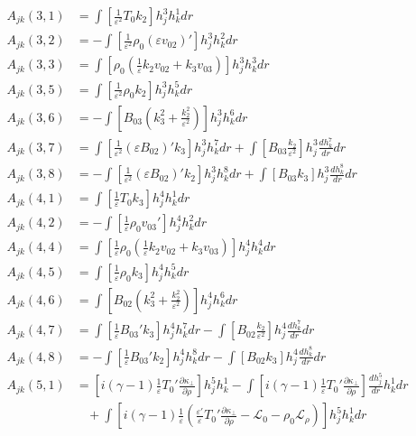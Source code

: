 \documentclass[11pt, fleqn]{article}
\newcommand{\HL}{\mathscr{L}}
\newcommand{\eps}{\varepsilon}
\begin{document}
\begin{align*}
	A_{jk}(3, 1) &=  \int \left[\frac{1}{\eps^2}T_0k_2\right]h_j^3 h_k^1 dr																				\\
	A_{jk}(3, 2) &= -\int \left[\frac{1}{\eps^2}\rho_0(\eps v_{02})'\right]h_j^3 h_k^2 dr																\\
	A_{jk}(3, 3) &=  \int \left[\rho_0\left(\frac{1}{\eps}k_2v_{02} + k_3v_{03}\right)\right] h_j^3 h_k^3 dr											\\
	A_{jk}(3, 5) &=  \int \left[\frac{1}{\eps^2}\rho_0k_2\right] h_j^3 h_k^5 dr																			\\
	A_{jk}(3, 6) &= -\int \left[B_{03}\left(k_3^2 + \frac{k_2^2}{\eps^2}\right)\right]h_j^3 h_k^6 dr													\\
	A_{jk}(3, 7) &=  \int \left[\frac{1}{\eps^2}(\eps B_{02})'k_3\right] h_j^3 h_k^7 dr  +  \int \left[ B_{03}\frac{k_2}{\eps^2}\right] h_j^3 \frac{dh_k^7}{dr} dr	\\
	A_{jk}(3, 8) &= -\int \left[\frac{1}{\eps^2}(\eps B_{02})'k_2\right] h_j^3 h_k^8 dr  +  \int \left[ B_{03}k_3\right]h_j^3 \frac{dh_k^8}{dr} dr		\\
	A_{jk}(4, 1) &=  \int \left[\frac{1}{\eps}T_0k_3\right] h_j^4 h_k^1 dr																				\\
	A_{jk}(4, 2) &= -\int \left[\frac{1}{\eps}\rho_0v_{03}'\right] h_j^4 h_k^2 dr																		\\
	A_{jk}(4, 4) &=  \int \left[\frac{1}{\eps}\rho_0\left(\frac{1}{\eps}k_2v_{02} + k_3v_{03}\right)\right] h_j^4 h_k^4 dr								\\
	A_{jk}(4, 5) &=  \int \left[\frac{1}{\eps}\rho_0k_3\right] h_j^4 h_k^5 dr																			\\
	A_{jk}(4, 6) &=  \int \left[B_{02}\left(k_3^2 + \frac{k_2^2}{\eps^2}\right)\right] h_j^4 h_k^6 dr													\\
	A_{jk}(4, 7) &=  \int \left[\frac{1}{\eps}B_{03}'k_3\right] h_j^4 h_k^7 dr - \int \left[B_{02}\frac{k_2}{\eps^2}\right] h_j^4 \frac{dh_k^7}{dr}dr   \\
	A_{jk}(4, 8) &= -\int \left[\frac{1}{\eps}B_{03}'k_2\right] h_j^4 h_k^8 dr - \int \left[B_{02}k_3\right] h_j^4 \frac{dh_k^8}{dr} dr					\\
	A_{jk}(5, 1) &=  \left[i(\gamma - 1)\frac{1}{\eps}T_0'\frac{\partial \kappa_\bot}{\partial \rho}\right] h_j^5 h_k^1 - \int \left[i(\gamma - 1)\frac{1}{\eps}T_0'\frac{\partial \kappa_\bot}{\partial \rho}\right] \frac{dh_j^5}{dr} h_k^1 dr		\\
				 &~~~~ +\int \left[i(\gamma - 1)\frac{1}{\eps}\left(\frac{\eps'}{\eps}T_0'\frac{\partial \kappa_\bot}{\partial \rho} - \HL_0 - \rho_0\HL_\rho\right)\right] h_j^5h_k^1 dr																\\

\end{align*}
\end{document}
